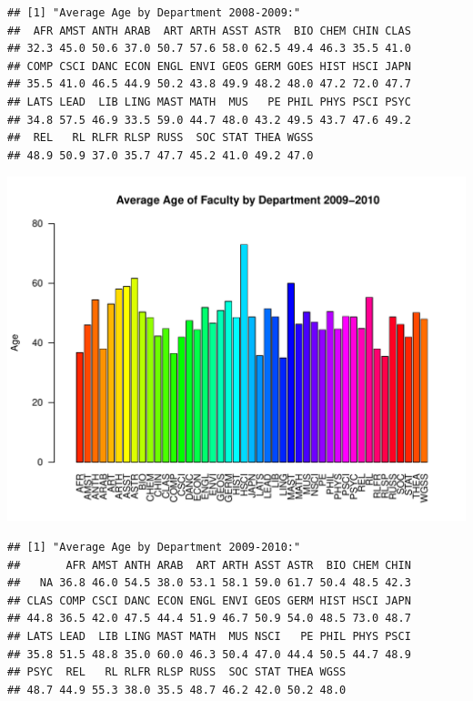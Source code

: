 \documentclass[12pt,a4paper]{article}\usepackage[]{graphicx}\usepackage[]{color}
\makeatletter
\def\maxwidth{ %
  \ifdim\Gin@nat@width>\linewidth
    \linewidth
  \else
    \Gin@nat@width
  \fi
}
\newenvironment{kframe}{%
 \def\at@end@of@kframe{}%
 \ifinner\ifhmode%
  \def\at@end@of@kframe{\end{minipage}}%
  \begin{minipage}{\columnwidth}%
 \fi\fi%
 \def\FrameCommand##1{\hskip\@totalleftmargin \hskip-\fboxsep
 \colorbox{shadecolor}{##1}\hskip-\fboxsep
     \hskip-\linewidth \hskip-\@totalleftmargin \hskip\columnwidth}%
 \MakeFramed {\advance\hsize-\width
   \@totalleftmargin\z@ \linewidth\hsize
   \@setminipage}}%
 {\par\unskip\endMakeFramed%
 \at@end@of@kframe}
\newenvironment{knitrout}{}{} %
\theoremstyle{definition}
\makeatother
\begin{document}
\begin{knitrout}
\begin{kframe}\begin{verbatim}
## [1] "Average Age by Department 2008-2009:"
##  AFR AMST ANTH ARAB  ART ARTH ASST ASTR  BIO CHEM CHIN CLAS 
## 32.3 45.0 50.6 37.0 50.7 57.6 58.0 62.5 49.4 46.3 35.5 41.0 
## COMP CSCI DANC ECON ENGL ENVI GEOS GERM GOES HIST HSCI JAPN 
## 35.5 41.0 46.5 44.9 50.2 43.8 49.9 48.2 48.0 47.2 72.0 47.7 
## LATS LEAD  LIB LING MAST MATH  MUS   PE PHIL PHYS PSCI PSYC 
## 34.8 57.5 46.9 33.5 59.0 44.7 48.0 43.2 49.5 43.7 47.6 49.2 
##  REL   RL RLFR RLSP RUSS  SOC STAT THEA WGSS 
## 48.9 50.9 37.0 35.7 47.7 45.2 41.0 49.2 47.0
\end{verbatim}
\end{kframe}
\includegraphics[width=\maxwidth]{figure/unnamed-chunk-10-6} 
\begin{kframe}\begin{verbatim}
## [1] "Average Age by Department 2009-2010:"
##       AFR AMST ANTH ARAB  ART ARTH ASST ASTR  BIO CHEM CHIN 
##   NA 36.8 46.0 54.5 38.0 53.1 58.1 59.0 61.7 50.4 48.5 42.3 
## CLAS COMP CSCI DANC ECON ENGL ENVI GEOS GERM HIST HSCI JAPN 
## 44.8 36.5 42.0 47.5 44.4 51.9 46.7 50.9 54.0 48.5 73.0 48.7 
## LATS LEAD  LIB LING MAST MATH  MUS NSCI   PE PHIL PHYS PSCI 
## 35.8 51.5 48.8 35.0 60.0 46.3 50.4 47.0 44.4 50.5 44.7 48.9 
## PSYC  REL   RL RLFR RLSP RUSS  SOC STAT THEA WGSS 
## 48.7 44.9 55.3 38.0 35.5 48.7 46.2 42.0 50.2 48.0
\end{verbatim}
\end{kframe}

\end{knitrout}
\end{document}
